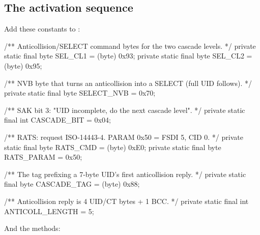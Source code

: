 \subsection{The activation sequence}

Add these constants to :

\begin{jcode}
    /** Anticollision/SELECT command bytes for the two cascade levels. */
    private static final byte SEL_CL1 = (byte) 0x93;
    private static final byte SEL_CL2 = (byte) 0x95;

    /** NVB byte that turns an anticollision into a SELECT (full UID follows). */
    private static final byte SELECT_NVB = 0x70;

    /** SAK bit 3: "UID incomplete, do the next cascade level". */
    private static final int CASCADE_BIT = 0x04;

    /** RATS: request ISO-14443-4. PARAM 0x50 = FSDI 5, CID 0. */
    private static final byte RATS_CMD   = (byte) 0xE0;
    private static final byte RATS_PARAM = 0x50;

    /** The tag prefixing a 7-byte UID's first anticollision reply. */
    private static final byte CASCADE_TAG = (byte) 0x88;

    /** Anticollision reply is 4 UID/CT bytes + 1 BCC. */
    private static final int ANTICOLL_LENGTH = 5;
\end{jcode}

And the methods:

